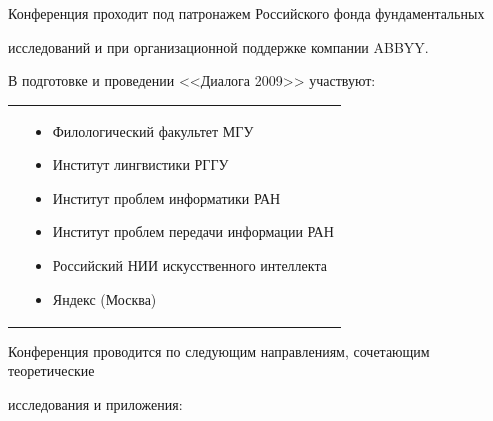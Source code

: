 \documentclass[10pt]{book}
\begin{document}
Конференция проходит под патронажем Российского фонда фундаментальных


исследований и при организационной поддержке компании ABBYY.


\vspace*{6pt}





В подготовке и проведении <<Диалога 2009>> участвуют:


\vspace*{-6pt}





\noindent


\begin{tabular}{p{7mm}p{420pt}}


\hspace*{7mm}


&\begin{itemize}


\item Филологический факультет МГУ


\item Институт лингвистики РГГУ


\item Институт проблем информатики РАН


\item Институт проблем передачи информации РАН


\item Российский НИИ искусственного интеллекта


\item Яндекс (Москва)


\end{itemize}


\end{tabular}





Конференция проводится по следующим направлениям, сочетающим теоретические


исследования и приложения:


\vspace*{-6pt}





\noindent
\end{document}
